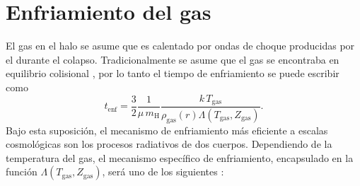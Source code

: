 \documentclass{article}
\begin{document}
\section{Enfriamiento del gas}
%
%
El gas en el halo se asume que es calentado por ondas de choque producidas por el durante el
colapso. Tradicionalmente se asume que el gas se encontraba en equilibrio colisional \citep[sin
embargo véase][]{Wiersma2009a}, por lo tanto el tiempo de enfriamiento se puede escribir como
%
$$
t_\text{enf} = \frac{3}{2}\frac{1}{\mu\,m_\text{H}}\frac{k\,T_\text{gas}}{\rho_\text{gas}(r)\Lambda(T_\text{gas}, Z_\text{gas})}.
$$
%
Bajo esta suposición, el mecanismo de enfriamiento más eficiente a escalas cosmológicas son los
procesos radiativos de dos cuerpos. Dependiendo de la temperatura del gas, el mecanismo específico
de enfriamiento, encapsulado en la función $\Lambda(T_\text{gas}, Z_\text{gas})$, será uno de los
siguientes \citep{Somerville2015}:
%
\end{document}
